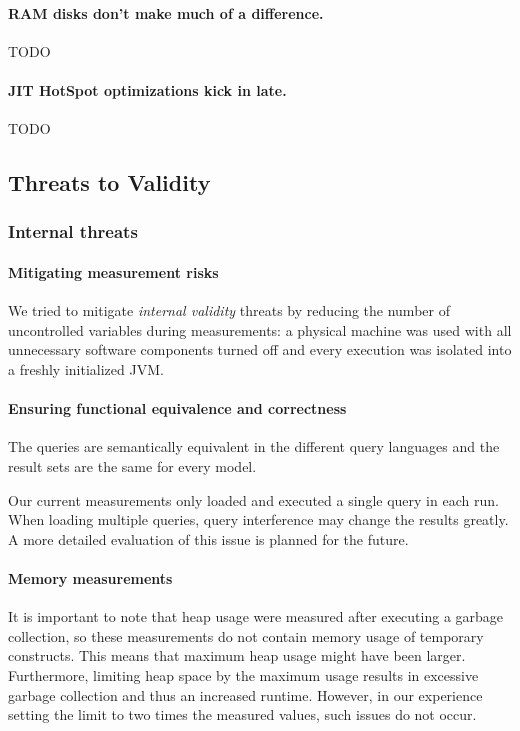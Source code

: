 \paragraph{RAM disks don't make much of a difference.}
TODO

\paragraph{JIT HotSpot optimizations kick in late.}
TODO

\subsection{Threats to Validity}

\subsubsection{Internal threats}

\paragraph{Mitigating measurement risks}
We tried to mitigate \emph{internal validity} threats by reducing the number of
uncontrolled variables during measurements: a physical machine was used with all
unnecessary software components turned off and every execution was isolated into
a freshly initialized JVM.

\paragraph{Ensuring functional equivalence and correctness}
The queries are semantically equivalent in the different query languages and the
result sets are the same for every model. 

Our current measurements only loaded and executed a single query in each run.
When loading multiple queries, query interference may change the results
greatly. A more detailed evaluation of this issue is planned for the future.


\paragraph{Memory measurements}
It is important to note that heap usage were measured after executing a garbage
collection, so these measurements do not contain memory usage of temporary
constructs. This means that maximum heap usage might have been larger. Furthermore,
limiting heap space by the maximum usage results in excessive garbage collection
and thus an increased runtime. However, in our experience setting the limit to
two times the measured values, such issues do not occur.



